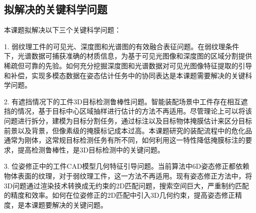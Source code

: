 \documentclass[12pt]{article}
\begin{document}



\subsection{拟解决的关键科学问题}

本课题拟解决以下三个关键科学问题：

1. 弱纹理工件的可见光、深度图和光谱图的有效融合表征问题。在弱纹理条件下，光谱数据可捕获准确的材质信息，为基于可见光图像和深度图的区域分割提供稀疏但可靠的先验。如何充分挖掘深度图和光谱数据对可见光图像特征提取的引导和补偿，实现多模态数据在姿态估计任务中的协同表达是本课题需要解决的关键科学问题。

2. 有遮挡情况下的工件3D目标检测鲁棒性问题。智能装配场景中工件存在相互遮挡的情况，基于目标中心区域抽样进行估计的方法不再适用。尽管理论上可以将该问题进行拆分，建模为目标分割任务，通过标注以及目标物体掩膜估计来区分目标前景以及背景，但像素级的掩膜标记成本过高。本课题研究的装配流程中的危化品通常为刚体，这常规目标检测任务有所不同，如何利用这一特性降低掩膜标注的要求，提高检测鲁棒性，是3D目标检测中的关键问题。

3. 位姿修正中的工件CAD模型几何特征引导问题。当前算法中6D姿态修正都依赖物体表面的纹理，对于弱纹理工件，这一方法不再适用。现有姿态修正方法中，将3D问题通过渲染技术转换成无约束的2D匹配问题，搜索空间巨大，严重制约匹配的精度和效率。如何在位姿修正的2D匹配中引入3D几何约束，提高姿态修正精度，是本课题要解决的关键问题。
\end{document}
